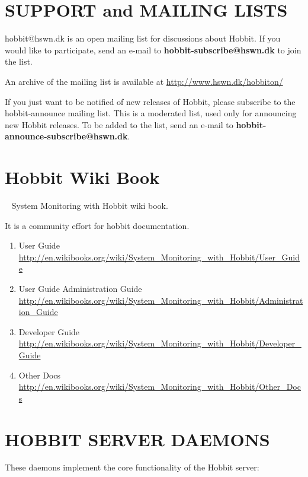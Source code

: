 \section{SUPPORT and MAILING LISTS}
hobbit@hswn.dk is an open mailing list for discussions about
Hobbit. If you would like to participate, send an e-mail to
\textbf{hobbit-subscribe@hswn.dk} to join the list. 


An archive of the mailing list is available at \url{http://www.hswn.dk/hobbiton/}


If you just want to be notified of new releases of Hobbit, please
subscribe to the hobbit-announce mailing list. This is a moderated
list, used only for announcing new Hobbit releases. To be added to
the list, send an e-mail to \textbf{hobbit-announce-subscribe@hswn.dk}. 

\section{Hobbit Wiki Book}

~\cite{wikibook:wikibooktjyang} System Monitoring with Hobbit wiki book.

It is a community effort for hobbit documentation.

\begin{enumerate}

\item User Guide  \url{http://en.wikibooks.org/wiki/System_Monitoring_with_Hobbit/User_Guide}

\item User Guide Administration Guide
  \url{http://en.wikibooks.org/wiki/System_Monitoring_with_Hobbit/Administration_Guide}

\item Developer Guide \url{http://en.wikibooks.org/wiki/System_Monitoring_with_Hobbit/Developer_Guide}

\item Other Docs
\url{http://en.wikibooks.org/wiki/System_Monitoring_with_Hobbit/Other_Docs}

\end{enumerate}

\section{HOBBIT SERVER DAEMONS}
 These daemons implement the core functionality of the Hobbit server: 

